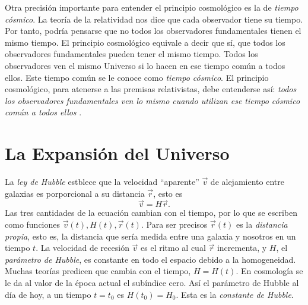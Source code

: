 \documentclass[a4paper,openright,12pt]{book}
\begin{document}
Otra precisión importante para entender el principio cosmológico es la de \textit{tiempo cósmico}. La teoría de la relatividad nos dice que cada observador tiene su tiempo. Por tanto, podría pensarse que no todos los observadores fundamentales tienen el mismo tiempo. El principio cosmológico equivale a decir que sí, que todos los observadores fundamentales pueden tener el mismo tiempo. Todos los observadores ven el mismo Universo si lo hacen en ese tiempo común a todos ellos. Este tiempo común se le conoce como \textit{tiempo cósmico}. El principio cosmológico, para atenerse a las premisas relativistas, debe entenderse así: \textit{todos los observadores fundamentales ven lo mismo cuando utilizan ese tiempo cósmico común a todos ellos} \cite{1.02}.


\section{La Expansión del Universo}
La \textit{ley de Hubble} \cite{1.1} estblece que la velocidad ``aparente'' $\vec{v}$ de alejamiento entre galaxias es porporcional a su distancia $\vec{r}$, esto es
\begin{equation}
\vec{v} = H\vec{r}.\label{eqn 1.1}
\end{equation}
Las tres cantidades de la ecuación cambian con el tiempo, por lo que se escriben como funciones $\vec{v}(t), H(t), \vec{r}(t)$. Para ser precisos $\vec{r}(t)$ es la \textit{distancia propia}, esto es, la distancia que sería medida entre una galaxia y nosotros en un tiempo $t$. La velocidad de recesión $\vec{v}$ es el ritmo al cual $\vec{r}$ incrementa, y $H$, el \textit{parámetro de Hubble}, es constante en todo el espacio debido a la homogeneidad. Muchas teorías predicen que cambia con el tiempo, $H = H(t)$. En cosmología se le da al valor de la época actual el subíndice cero. Así el parámetro de Hubble al día de hoy, a un tiempo $t= t_{0}$ es $H(t_{0})= H_{0}$. Esta es la \textit{constante de Hubble}.
\end{document}
